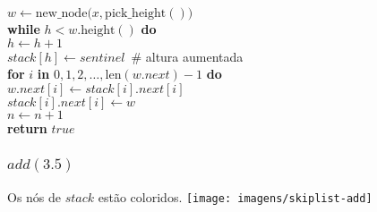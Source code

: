 \documentclass{beamer}
\begin{document}
\begin{frame}[shrink]
\begin{flushleft}
\hspace*{1em} \ensuremath{\ensuremath{\mathit{w}} \gets  \ensuremath{\mathrm{new\_node}(\ensuremath{\mathit{x}}, \mathrm{pick\_height}()})}\\
\hspace*{1em} {\color{black} \textbf{while}} \ensuremath{\ensuremath{\mathit{h}} < \ensuremath{\mathit{w}}.\mathrm{height}()} {\color{black} \textbf{do}} \\
\hspace*{1em} \hspace*{1em} \ensuremath{\ensuremath{\mathit{h}} \gets  \ensuremath{\ensuremath{\mathit{h}} + 1}}\\
\hspace*{1em} \hspace*{1em} \ensuremath{\ensuremath{\mathit{stack}}[\ensuremath{h}] \gets  \ensuremath{sentinel}   }\ {\color{blue}\# altura aumentada}\\
\hspace*{1em} {\color{black} \textbf{for}} \ensuremath{i} {\color{black} \textbf{in}} \ensuremath{0,1,2,\ldots,\mathrm{len}(\ensuremath{\mathit{w}}.\ensuremath{\mathit{next}})-1} {\color{black} \textbf{do}} \\
\hspace*{1em} \hspace*{1em} \ensuremath{\ensuremath{\mathit{w}}.\ensuremath{\ensuremath{\mathit{next}}[\ensuremath{\mathit{i}}]} \gets  \ensuremath{\ensuremath{\mathit{stack}}[\ensuremath{\mathit{i}}].\ensuremath{\mathit{next}}[\ensuremath{\mathit{i}}]}}\\
\hspace*{1em} \hspace*{1em} \ensuremath{\ensuremath{\mathit{stack}}[\ensuremath{i}].\ensuremath{\ensuremath{\mathit{next}}[\ensuremath{\mathit{i}}]} \gets  \ensuremath{w}}\\
\hspace*{1em} \ensuremath{\ensuremath{\mathit{n}} \gets  \ensuremath{\ensuremath{\mathit{n}} + 1}}\\
\hspace*{1em} {\color{black} \textbf{return}} \ensuremath{\ensuremath{\mathit{true}}}\\
\end{flushleft}

\end{frame}

\begin{frame}
\frametitle{$add(3.5)$}
Os nós de $stack$ estão coloridos.
\texttt{[image: imagens/skiplist-add]}
\end{frame}
\end{document}
